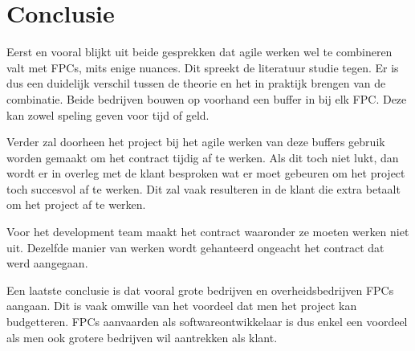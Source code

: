 \documentclass{hogent-article}
\begin{document}
	
	\section{Conclusie}
	Eerst en vooral blijkt uit beide gesprekken dat agile werken wel te combineren valt met FPCs, mits enige nuances. Dit spreekt de literatuur studie tegen. Er is dus een duidelijk verschil tussen de theorie en het in praktijk brengen van de combinatie. Beide bedrijven bouwen op voorhand een buffer in bij elk FPC. Deze kan zowel speling geven voor tijd of geld.
	
	Verder zal doorheen het project bij het agile werken van deze buffers gebruik worden gemaakt om het contract tijdig af te werken. Als dit toch niet lukt, dan wordt er in overleg met de klant besproken wat er moet gebeuren om het project toch succesvol af te werken. Dit zal vaak resulteren in de  klant die extra betaalt om het project af te werken.
	
	Voor het development team maakt het contract waaronder ze moeten werken niet uit. Dezelfde manier van werken wordt gehanteerd ongeacht het contract dat werd aangegaan.
	
	Een laatste conclusie is dat vooral grote bedrijven en overheidsbedrijven FPCs aangaan. Dit is vaak omwille van het voordeel dat men het project kan budgetteren. FPCs aanvaarden als softwareontwikkelaar is dus enkel een voordeel als men ook grotere bedrijven wil aantrekken als klant.
	
	\printbibliography[heading=bibintoc]
	
\end{document}
